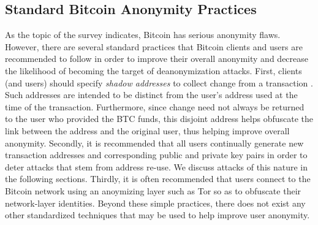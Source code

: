 \subsection{Standard Bitcoin Anonymity Practices}
As the topic of the survey indicates, Bitcoin has serious anonymity flaws. However, there are several standard practices that Bitcoin clients and users are recommended to follow in order to improve their overall anonymity and decrease the likelihood of becoming the target of deanonymization attacks. First, clients (and users) should specify \emph{shadow addresses} to collect change from a transaction \cite{bitcoin-shadow-addresses}. Such addresses are intended to be distinct from the user's address used at the time of the transaction. Furthermore, since change need not always be returned to the user who provided the BTC funds, this disjoint address helps obfuscate the link between the address and the original user, thus helping improve overall anonymity. Secondly, it is recommended that all users continually generate new transaction addresses and corresponding public and private key pairs in order to deter attacks that stem from address re-use. We discuss attacks of this nature in the following sections. Thirdly, it is often recommended that users connect to the Bitcoin network using an anoymizing layer such as Tor \cite{tor,bitcoin-tor-wiki} so as to obfuscate their network-layer identities. Beyond these simple practices, there does not exist any other standardized techniques that may be used to help improve user anonymity.

